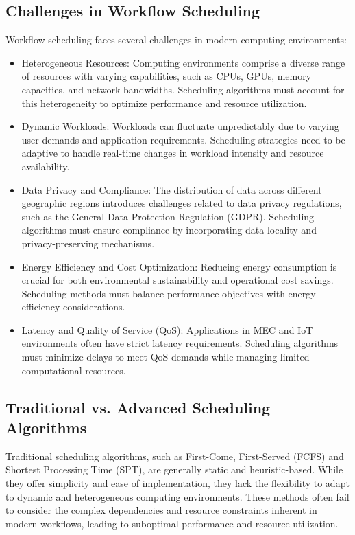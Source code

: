 \documentclass[a4paper, final]{article}
\begin{document}
\subsection{Challenges in Workflow Scheduling}
Workflow scheduling faces several challenges in modern computing environments:
\begin{itemize}
    \item Heterogeneous Resources: Computing environments comprise a diverse range of resources with varying capabilities, 
    such as CPUs, GPUs, memory capacities, and network bandwidths. Scheduling algorithms must account for this heterogeneity 
    to optimize performance and resource utilization.
    \item Dynamic Workloads: Workloads can fluctuate unpredictably due to varying user demands and application requirements. 
    Scheduling strategies need to be adaptive to handle real-time changes in workload intensity and resource availability.

    \item Data Privacy and Compliance: The distribution of data across different geographic regions introduces challenges related 
    to data privacy regulations, such as the General Data Protection Regulation (GDPR). Scheduling algorithms must ensure compliance 
    by incorporating data locality and privacy-preserving mechanisms.
    
    \item Energy Efficiency and Cost Optimization: Reducing energy consumption is crucial for both environmental sustainability 
    and operational cost savings. Scheduling methods must balance performance objectives with energy efficiency considerations.
    
    \item Latency and Quality of Service (QoS): Applications in MEC and IoT environments often have strict latency requirements. 
    Scheduling algorithms must minimize delays to meet QoS demands while managing limited computational resources.
\end{itemize}

\subsection{Traditional vs. Advanced Scheduling Algorithms}
Traditional scheduling algorithms, such as First-Come, First-Served (FCFS) and Shortest Processing Time (SPT), 
are generally static and heuristic-based. While they offer simplicity and ease of implementation, they lack the 
flexibility to adapt to dynamic and heterogeneous computing environments. These methods often fail to consider the 
complex dependencies and resource constraints inherent in modern workflows, leading to suboptimal performance and 
resource utilization.
\end{document}
